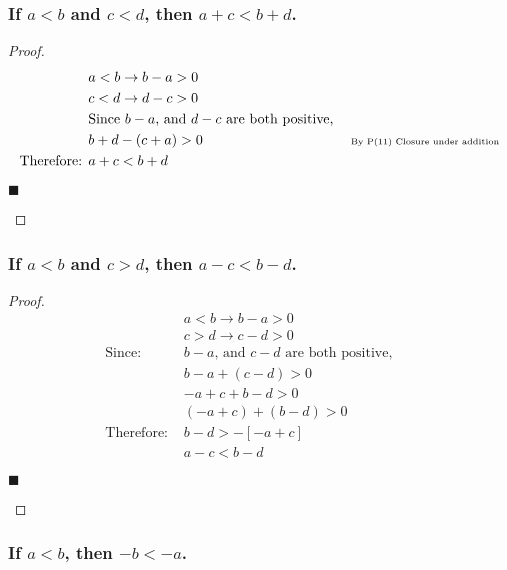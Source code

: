 \documentclass[letterpaper, 10 pt, conference]{ieeeconf}  %
\begin{document}
\subsubsection{\textbf{If $a < b$ and $c < d$, then $a + c < b + d$.}}

\begin{proof}
\begin{align}
    &a < b \rightarrow b - a > 0 &&\\
    &c < d \rightarrow d - c > 0 &&\\
    &\text{\small{Since $b -a$, and $d - c $ are both positive,}} &&\\
    &b + d - (c + a) > 0 && \text{\tiny{ By P(11) Closure under addition}} \\
    \text{Therefore: } &a + c < b + d &&
\end{align}
\begin{flushright}
$\blacksquare$
\end{flushright}
\end{proof}


\subsubsection{\textbf{If $a < b$ and $c > d$, then $a - c < b - d$.}}

\begin{proof}
\begin{align}
    &a < b \rightarrow b - a > 0 &&\\
    &c > d \rightarrow c - d > 0 &&\\
    \text{Since: }&\text{$b - a$, and $c - d$ are both positive,} &&\\
    &b - a + (c - d) > 0 && \\
    &-a + c + b - d > 0 &&\\
    &(-a + c) + (b - d) > 0 &&\\
    \text{Therefore: } & b - d > - [-a + c]&&\\
    & a - c < b - d&&
\end{align}
\begin{flushright}
$\blacksquare$
\end{flushright}
\end{proof}

\subsubsection{\textbf{If $a < b$, then $-b < -a$.}}
\end{document}
